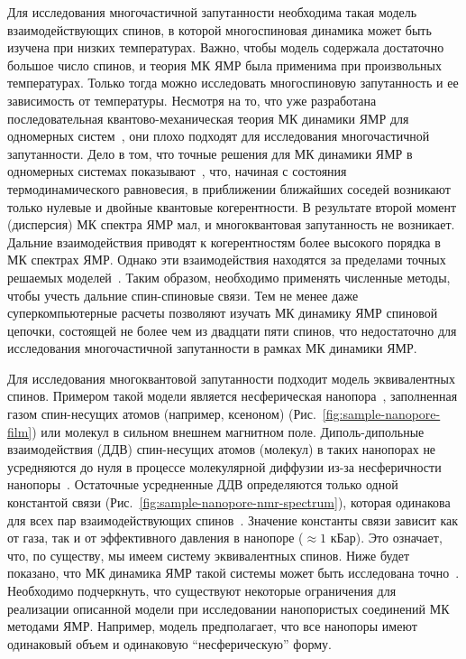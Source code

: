Для исследования многочастичной запутанности необходима такая модель взаимодействующих спинов,
в которой многоспиновая динамика может быть изучена при низких температурах.
Важно, чтобы модель содержала достаточно большое число спинов,
и теория МК ЯМР была применима при произвольных температурах.
Только тогда можно исследовать многоспиновую запутанность и ее зависимость от температуры.
Несмотря на то, что уже разработана последовательная квантово-механическая теория МК динамики ЯМР для одномерных систем~\cite{Feldman1996, Feldman1997, Doronin2000},
они плохо подходят для исследования многочастичной запутанности.
Дело в том, что точные решения для МК динамики ЯМР в одномерных системах показывают~\cite{Feldman1996, Feldman1997, Doronin2000},
что, начиная с состояния термодинамического равновесия,
в приближении ближайших соседей возникают только нулевые и двойные квантовые когерентности.
В результате второй момент (дисперсия) МК спектра ЯМР мал, и многоквантовая запутанность не возникает.
Дальние взаимодействия приводят к когерентностям более высокого порядка в МК спектрах ЯМР.
Однако эти взаимодействия находятся за пределами точных решаемых моделей~\cite{Munowitz1987, Alvarez2015, Wei2018}.
Таким образом, необходимо применять численные методы, чтобы учесть дальние спин-спиновые связи.
Тем не менее даже суперкомпьютерные расчеты позволяют изучать МК динамику ЯМР спиновой цепочки,
состоящей не более чем из двадцати пяти спинов,
что недостаточно для исследования многочастичной запутанности в рамках МК динамики ЯМР.

Для исследования многоквантовой запутанности подходит модель эквивалентных спинов.
Примером такой модели является  несферическая нанопора~\cite{Baugh2001},
заполненная газом спин-несущих атомов (например, ксеноном) (Рис.~\ref{fig:sample-nanopore-film})
или молекул в сильном внешнем магнитном поле.
Диполь-дипольные взаимодействия (ДДВ) спин-несущих атомов (молекул) в таких нанопорах не усредняются до нуля
в процессе молекулярной диффузии из-за несферичности нанопоры~\cite{Baugh2001, Feldman2004}.
Остаточные усредненные ДДВ определяются только одной константой связи (Рис.~\ref{fig:sample-nanopore-nmr-spectrum}),
которая одинакова для всех пар взаимодействующих спинов~\cite{Baugh2001, Feldman2004}.
Значение константы связи зависит как от газа,
так и от эффективного давления в нанопоре ($\approx 1$ кБар).
Это означает, что, по существу, мы имеем систему эквивалентных спинов.
Ниже будет показано, что МК динамика ЯМР такой системы может быть исследована точно~\cite{Doronin2009}.
Необходимо подчеркнуть,
что существуют некоторые ограничения для реализации описанной модели
при исследовании нанопористых соединений МК методами ЯМР.
Например, модель предполагает, что все нанопоры имеют одинаковый объем и одинаковую ``несферическую'' форму.


